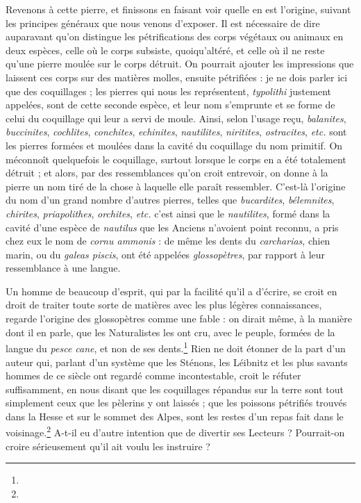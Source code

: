 \documentclass[a4paper, 11pt, oneside, polutonikogreek, french]{article}
\begin{document}
Revenons à cette pierre, et finissons en faisant voir quelle en est l'origine, suivant les principes généraux que nous venons d'exposer. Il est nécessaire de dire auparavant qu'on distingue les pétrifications des corps végétaux ou animaux en deux espèces, celle où le corps subsiste, quoiqu'altéré, et celle où il ne reste qu'une pierre moulée sur le corps détruit. On pourrait ajouter les impressions que laissent ces corps sur des matières molles, ensuite pétrifiées : je ne dois parler ici que des coquillages ; les pierres qui nous les représentent, \emph{typolithi} justement appelées, sont de cette seconde espèce, et leur nom s'emprunte et se forme de celui du coquillage qui leur a servi de moule. Ainsi, selon l'usage reçu, \emph{balanites}, \emph{buccinites}, \emph{cochlites}, \emph{conchites}, \emph{echinites}, \emph{nautilites}, \emph{niritites}, \emph{ostracites}, \emph{etc.} sont les pierres formées et moulées dans la cavité du coquillage du nom primitif. On méconnoît quelquefois le coquillage, surtout lorsque le corps en a été totalement détruit ; et alors, par des ressemblances qu'on croit entrevoir, on donne à la pierre un nom tiré de la chose à laquelle elle paraît ressembler. C'est-là l'origine du nom d'un grand nombre d'autres pierres, telles que \emph{bucardites}, \emph{bélemnites}, \emph{chirites}, \emph{priapolithes}, \emph{orchites}, \emph{etc.} c'est ainsi que le \emph{nautilites}, formé dans la cavité d'une espèce de \emph{nautilus} que les Anciens n'avoient point reconnu, a pris chez eux le nom de \emph{cornu ammonis} : de même les dents du \emph{carcharias}, chien marin, ou du \emph{galeas piscis}, ont été appelées \emph{glossopètres}, par rapport à leur ressemblance à une langue.

Un homme de beaucoup d'esprit, qui par la facilité qu'il a d'écrire, se croit en droit de traiter toute sorte de matières avec les plus légères connaissances, regarde l'origine des glossopètres comme une fable : on dirait même, à la manière dont il en parle, que les Naturalistes les ont cru, avec le peuple, formées de la langue du \emph{pesce cane}, et non de ses dents.\footnote{} Rien ne doit étonner de la part d'un auteur qui, parlant d'un système que les Sténons, les Léibnitz et les plus savants hommes de ce siècle ont regardé comme incontestable, croit le réfuter suffisamment, en nous disant que les coquillages répandus sur la terre sont tout simplement ceux que les pèlerins y ont laissés ; que les poissons pétrifiés trouvés dans la Hesse et sur le sommet des Alpes, sont les restes d'un repas fait dans le voisinage.\footnote{} A-t-il eu d'autre intention que de divertir ses Lecteurs ? Pourrait-on croire sérieusement qu'il ait voulu les instruire ?
\end{document}
